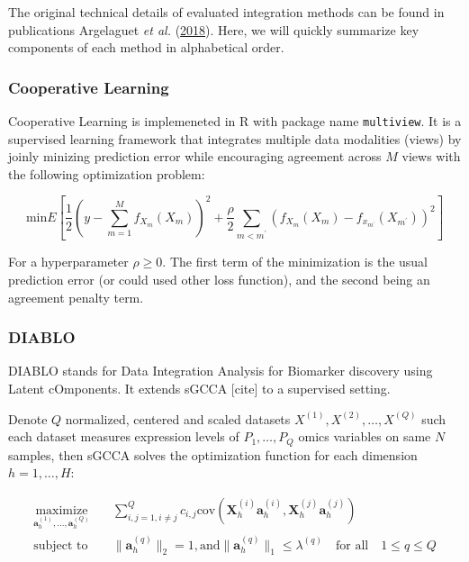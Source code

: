 \documentclass[
]{article}
\begin{document}
The original technical details of evaluated integration methods can be found in publications Argelaguet \emph{et al.} (\protect\hyperlink{ref-Argelaguet2018}{2018}). Here, we will quickly summarize key components of each method in alphabetical order.

\hypertarget{cooperative-learning}{%
\subsubsection{Cooperative Learning}\label{cooperative-learning}}

Cooperative Learning is implemeneted in R with package name \texttt{multiview}. It is a supervised learning framework that integrates multiple data modalities (views) by joinly minizing prediction error while encouraging agreement across \(M\) views with the following optimization problem:

\[
\text{min} E[\frac{1}{2}(y - \sum_{m=1}^M f_{X_m} (X_m))^2 + \frac{\rho}{2} \sum_{m < m^{\prime}} ( f_{X_m}(X_m) - f_{x_{m^{\prime}}} (X_{m^{\prime}})  )^2]
\]

For a hyperparameter \(\rho \geq 0\). The first term of the minimization is the usual prediction error (or could used other loss function), and the second being an agreement penalty term.

\hypertarget{diablo}{%
\subsubsection{DIABLO}\label{diablo}}

DIABLO stands for Data Integration Analysis for Biomarker discovery using Latent cOmponents. It extends sGCCA {[}cite{]} to a supervised setting.

Denote \(Q\) normalized, centered and scaled datasets \(X^{(1)}, X^{(2)}, \dots, X^{(Q)}\) such each dataset measures expression levels of \(P_1, \dots, P_Q\) omics variables on same \(N\) samples, then sGCCA solves the optimization function for each dimension \(h = 1, \ldots, H\):

\[
\begin{aligned}
\underset{\mathbf{a}_h^{(1)}, \ldots, \mathbf{a}_h^{(Q)}}{\text{maximize}} & \quad \sum_{i,j=1, i \neq j}^{Q} c_{i,j}   \text{cov}(\mathbf{X}_h^{(i)} \mathbf{a}_h^{(i)}, \mathbf{X}_h^{(j)} \mathbf{a}_h^{(j)})  \\
\text{subject to} & \quad  \|\mathbf{a}_h^{(q)}\|_2 = 1, \text{and} \|\mathbf{a}_h^{(q)}\|_1 \leq \lambda^{(q)} \quad \text{for all} \quad 1 \leq q \leq Q
\end{aligned}
\]
\end{document}
